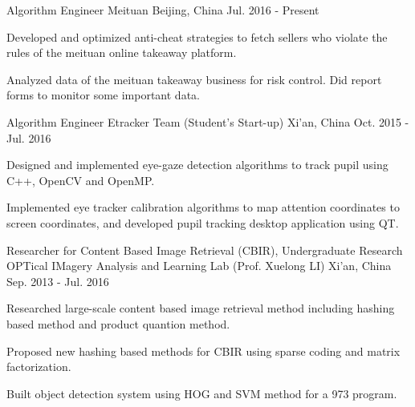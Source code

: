 

\begin{cventries}

  \cventry
    {Algorithm Engineer} %
    {Meituan} %
    {Beijing, China} %
    {Jul. 2016 - Present} %
    {
      \begin{cvitems} %
        \item {Developed and optimized anti-cheat strategies to fetch sellers who violate the rules of the meituan online takeaway platform.}
        \item {Analyzed data of the meituan takeaway business for risk control. Did report forms to monitor some important data.}
      \end{cvitems}
    }

  \cventry
    {Algorithm Engineer} %
    {Etracker Team (Student's Start-up)} %
    {Xi'an, China} %
    {Oct. 2015 - Jul. 2016} %
    {
      \begin{cvitems} %
        \item {Designed and implemented eye-gaze detection algorithms to track pupil using C++, OpenCV and OpenMP.}
        \item {Implemented eye tracker calibration algorithms to map attention coordinates to screen coordinates, and developed pupil tracking desktop application using QT.}
      \end{cvitems}
    }

  \cventry
    {Researcher for Content Based Image Retrieval (CBIR), Undergraduate Research} %
    {OPTical IMagery Analysis and Learning Lab (Prof. Xuelong LI)} %
    {Xi'an, China} %
    {Sep. 2013 - Jul. 2016} %
    {
      \begin{cvitems} %
        \item {Researched large-scale content based image retrieval method including hashing based method and product quantion method.}
        \item {Proposed new hashing based methods for CBIR using sparse coding and matrix factorization.}
        \item {Built object detection system using HOG and SVM method for a 973 program.}
      \end{cvitems}
    }

\end{cventries}
